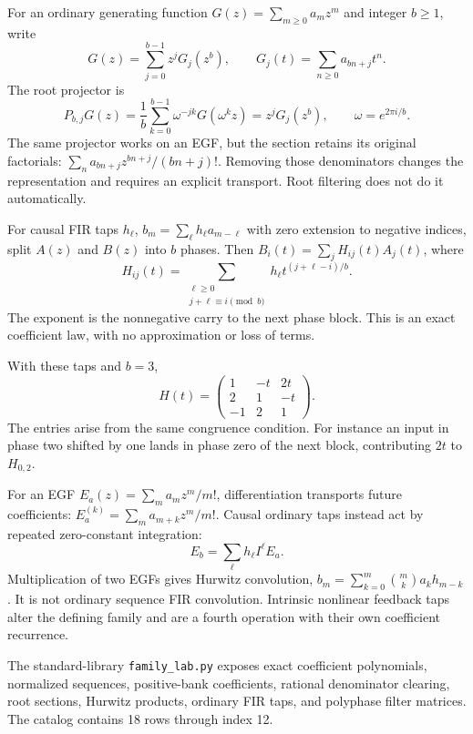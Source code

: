 For an ordinary generating function $G(z)=\sum_{m\ge0}a_mz^m$ and
integer $b\ge1$, write
\[
G(z)=\sum_{j=0}^{b-1}z^jG_j(z^b),\qquad
G_j(t)=\sum_{n\ge0}a_{bn+j}t^n.
\]
The root projector is
\[
P_{b,j}G(z)=\frac1b\sum_{k=0}^{b-1}\omega^{-jk}G(\omega^kz)
=z^jG_j(z^b),\qquad\omega=e^{2\pi i/b}.
\]
The same projector works on an EGF, but the section retains its original
factorials: $\sum_na_{bn+j}z^{bn+j}/(bn+j)!$.
Removing those denominators changes the representation and requires an
explicit transport. Root filtering does not do it automatically.

For causal FIR taps $h_\ell$, $b_m=\sum_\ell h_\ell a_{m-\ell}$ with
zero extension to negative indices, split $A(z)$ and $B(z)$ into $b$ phases.
Then $B_i(t)=\sum_jH_{ij}(t)A_j(t)$, where
\[
\boxed{H_{ij}(t)=\sum_{\substack{\ell\ge0\\j+\ell\equiv i\pmod b}}
h_\ell t^{(j+\ell-i)/b}.}
\]
The exponent is the nonnegative carry to the next phase block. This is an
exact coefficient law, with no approximation or loss of terms.

With these taps and $b=3$,
\[
H(t)=\begin{pmatrix}
1&-t&2t\\2&1&-t\\-1&2&1
\end{pmatrix}.
\]
The entries arise from the same congruence condition. For instance an input
in phase two shifted by one lands in phase zero of the next block, contributing
$2t$ to $H_{0,2}$.

For an EGF $E_a(z)=\sum_ma_mz^m/m!$, differentiation transports future
coefficients: $E_a^{(k)}=\sum_ma_{m+k}z^m/m!$.
Causal ordinary taps instead act by repeated zero-constant integration:
\[
E_b=\sum_\ell h_\ell I^\ell E_a.
\]
Multiplication of two EGFs gives Hurwitz convolution,
$b_m=\sum_{k=0}^m\binom mk a_kh_{m-k}$.
It is not ordinary sequence FIR convolution. Intrinsic nonlinear feedback
taps alter the defining family and are a fourth operation with their own
coefficient recurrence.

The standard-library \texttt{family\_lab.py} exposes exact coefficient
polynomials, normalized sequences, positive-bank coefficients, rational
denominator clearing, root sections, Hurwitz products, ordinary FIR taps,
and polyphase filter matrices. The catalog contains 18 rows through index 12.

